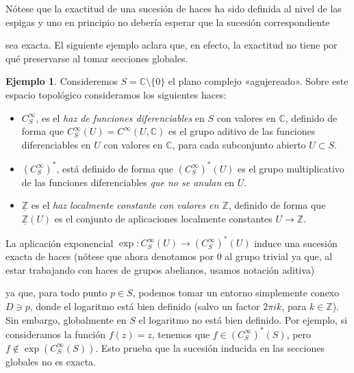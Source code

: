 \documentclass[12pt,a4paper]{article}
\theoremstyle{definition} \newtheorem{defn}[thm]{Definición}
\theoremstyle{definition} \newtheorem{ejemplo}[thm]{Ejemplo}
\theoremstyle{definition} \newtheorem{ejercicio}[thm]{Ejercicio}
\def\CC{\mathbb{C}}
\def\FF{\mathscr{F}}
\def\GG{\mathscr{G}}
\def\HH{\mathscr{H}}
\begin{document}
      Nótese que la exactitud de una sucesión de haces ha sido definida al nivel de las espigas y uno en principio no debería esperar que la sucesión correspondiente
      \begin{center}
      \end{center}
      sea exacta. El siguiente ejemplo aclara que, en efecto, la exactitud no tiene por qué preservarse al tomar secciones globales.

    \begin{ejemplo}
      Consideremos $S=\CC\setminus \{0\}$ el plano complejo «agujereado». Sobre este espacio topológico consideramos los siguientes haces:
      \begin{itemize}
	\item $C^\infty_S$, es el \emph{haz de funciones diferenciables} en $S$ con valores en $\CC$, definido de forma que $C^\infty_S(U)=C^\infty(U,\CC)$ es el grupo aditivo de las funciones diferenciables en $U$ con valores en $\CC$, para cada subconjunto abierto $U\subset S$.
	\item $(C^\infty_S)^*$, está definido de forma que $(C^\infty_S)^*(U)$ es el grupo multiplicativo de las funciones diferenciables \emph{que no se anulan} en $U$.
	\item $\underline{\mathbb{Z}}$ es el \emph{haz localmente constante con valores en $\mathbb{Z}$}, definido de forma que $\underline{\mathbb{Z}}(U)$ es el conjunto de aplicaciones localmente constantes $U\rightarrow \mathbb{Z}$.
      \end{itemize}
      La aplicación exponencial $\exp:C^\infty_S(U) \rightarrow (C^\infty_S)^*(U)$ induce una sucesión exacta de haces (nótese que ahora denotamos por $0$ al grupo trivial ya que, al estar trabajando con haces de grupos abelianos, usamos notación aditiva)
      \begin{center}
      \end{center}
      ya que, para todo punto $p\in S$, podemos tomar un entorno simplemente conexo $D\ni p$, donde el logaritmo está bien definido (salvo un factor $2\pi i k$, para $k\in \mathbb{Z}$). Sin embargo, globalmente en $S$ el logaritmo no está bien definido. Por ejemplo, si consideramos la función $f(z)=z$, tenemos que $f\in (C^\infty_S)^*(S)$, pero $f\not \in \exp(C^\infty_S(S))$. Esto prueba que la sucesión inducida en las secciones globales no es exacta.
    \end{ejemplo}
    
\end{document}

